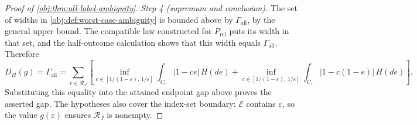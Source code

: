 \begin{proof}[Proof of \cref{obj:thm:all-label-ambiguity}]
\textit{Step 4 (supremum and conclusion).}
The set of widths in \cref{obj:def:worst-case-ambiguity} is bounded above by \(\Gamma_{\mathrm{all}}\), by the general upper bound. The compatible law constructed for \(P_{\mathrm{rel}}\) puts its width in that set, and the half-outcome calculation shows that this width equals \(\Gamma_{\mathrm{all}}\). Therefore
\[
D_H(g)=\Gamma_{\mathrm{all}}
=\sum_{r\in\mathcal R_J}\left[
\inf_{c\in[1/(1-\varepsilon),\,1/\varepsilon]}
 \int_{C_r}|1-ce|\,H(de)
+
\inf_{c\in[1/(1-\varepsilon),\,1/\varepsilon]}
 \int_{C_r}|1-c(1-e)|\,H(de)
\right].
\]
Substituting this equality into the attained endpoint gap above proves the asserted gap. The hypotheses also cover the index-set boundary: \(\mathcal E\) contains \(\varepsilon\), so the value \(g(\varepsilon)\) ensures \(\mathcal R_J\) is nonempty.
\end{proof}
